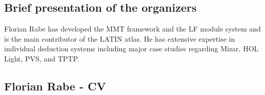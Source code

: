 \documentclass[a4paper,11pt]{article}
\begin{document}
\subsection{Brief presentation of the organizers}
Florian Rabe has developed the MMT framework and the LF module system and is the main contributor of the LATIN atlas. He has extensive expertise in individual deduction systems including major case studies regarding Mizar, HOL Light, PVS, and TPTP.

 \newpage
  \subsection{Florian Rabe - CV}
    
\end{document}
